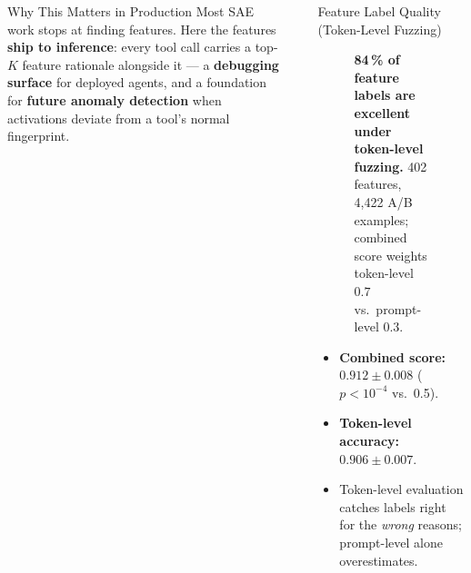 \documentclass[final]{beamer}
\newlength{\sepwidth}
\newlength{\colwidth}
\newcommand{\separatorcolumn}{\begin{column}{\sepwidth}\end{column}}
\begin{document}
\begin{frame}[t]
\begin{columns}[t]
\begin{column}{\colwidth}
\begin{exampleblock}{Why This Matters in Production}
    \large
    Most SAE work stops at finding features. Here the features
    \textbf{ship to inference}: every tool call carries a top-$K$ feature
    rationale alongside it --- a \textbf{debugging surface} for deployed
    agents, and a foundation for \textbf{future anomaly detection} when
    activations deviate from a tool's normal fingerprint.

  \end{exampleblock}

\end{column}

\separatorcolumn

\begin{column}{\colwidth}

  \begin{block}{Feature Label Quality (Token-Level Fuzzing)}

    \begin{figure}
      \centering
      \caption{\textbf{84\,\% of feature labels are excellent under
        token-level fuzzing.} 402 features, 4{,}422 A/B examples; combined
        score weights token-level $0.7$ vs.\ prompt-level $0.3$.}
    \end{figure}

    \begin{itemize}
      \item \textbf{Combined score:} $0.912 \pm 0.008$ ($p<10^{-4}$ vs.\ 0.5).
      \item \textbf{Token-level accuracy:} $0.906 \pm 0.007$.
      \item Token-level evaluation catches labels right for the
            \emph{wrong} reasons; prompt-level alone overestimates.
    \end{itemize}


\end{block}
\end{column}
\end{columns}
\end{frame}
\end{document}
